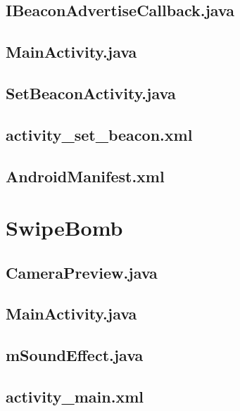 \documentclass[11pt,a4j]{jarticle}
\begin{document}
\subsection{IBeaconAdvertiseCallback.java}
	
	\newpage
\subsection{MainActivity.java}
	
	\newpage
\subsection{SetBeaconActivity.java}
	
	\newpage



\subsection{activity\_set\_beacon.xml}
	
	\newpage
\subsection{AndroidManifest.xml}
	
	\newpage


\section{SwipeBomb}
\subsection{CameraPreview.java}
	
	\newpage
\subsection{MainActivity.java}
	
	\newpage
\subsection{mSoundEffect.java}
	
	\newpage


\subsection{activity\_main.xml}
	
	\newpage
\end{document}

